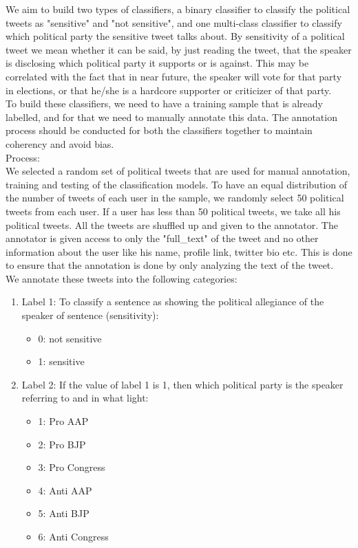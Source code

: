 \documentclass[a4paper,11pt]{article}
\begin{document}
We aim to build two types of classifiers, a binary classifier to classify the political tweets as "sensitive" and "not sensitive", and one multi-class classifier to classify which political party the sensitive tweet talks about. By sensitivity of a political tweet we mean whether it can be said, by just reading the tweet, that the speaker is disclosing which political party it supports or is against. This may be correlated with the fact that in near future, the speaker will vote for that party in elections, or that he/she is a hardcore supporter or criticizer of that party.
\medskip\\
To build these classifiers, we need to have a training sample that is already labelled, and for that we need to manually annotate this data. The annotation process should be conducted for both the classifiers together to maintain coherency and avoid bias.
\medskip\\
Process:
\medskip\\
We selected a random set of political tweets that are used for manual annotation, training and testing of the classification models. To have an equal distribution of the number of tweets of each user in the sample, we randomly select 50 political tweets from each user. If a user has less than 50 political tweets, we take all his political tweets. All the tweets are shuffled up and given to the annotator. The annotator is given access to only the "full\_text" of the tweet and no other information about the user like his name, profile link, twitter bio etc. This is done to ensure that the annotation is done by only analyzing the text of the tweet.\\
We annotate these tweets into the following categories:
\begin{enumerate}
    \item Label 1: To classify a sentence as showing the political allegiance of the speaker of sentence (sensitivity):
    \begin{itemize}
        \item 0: not sensitive
        \item 1: sensitive 
    \end{itemize}
    \item Label 2: If the value of label 1 is 1, then which political party is the speaker referring to and in what light:
    \begin{itemize}
        \item 1: Pro AAP
        \item 2: Pro BJP
        \item 3: Pro Congress
        \item 4: Anti AAP
        \item 5: Anti BJP
        \item 6: Anti Congress
    \end{itemize}
\end{enumerate}
\end{document}
